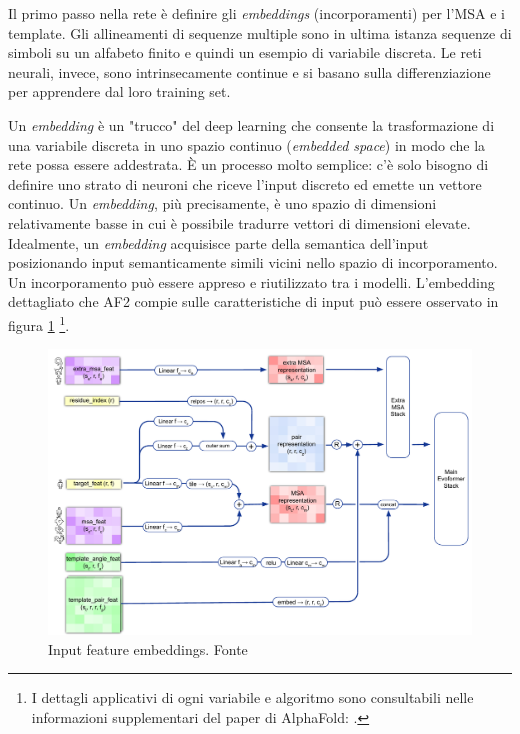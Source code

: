Il primo passo nella rete è definire gli \textit{embeddings} (incorporamenti) per l'MSA e i template. Gli allineamenti di sequenze multiple sono in ultima istanza sequenze di simboli su un alfabeto finito e quindi un esempio di variabile discreta. Le reti neurali, invece, sono intrinsecamente continue e si basano sulla differenziazione per apprendere dal loro training set. 

\par Un \textit{embedding} è un "trucco" del deep learning che consente la trasformazione di una variabile discreta in uno spazio continuo (\textit{embedded space}) in modo che la rete possa essere addestrata. È un processo molto semplice: c'è solo bisogno di definire uno strato di neuroni che riceve l'input discreto ed emette un vettore continuo. Un \textit{embedding}, più precisamente, è uno spazio di dimensioni relativamente basse in cui è possibile tradurre vettori di dimensioni elevate.  Idealmente, un \textit{embedding} acquisisce parte della semantica dell'input posizionando input semanticamente simili vicini nello spazio di incorporamento.  Un incorporamento può essere appreso e riutilizzato tra i modelli. L'embedding dettagliato che AF2 compie sulle caratteristiche di input può essere osservato in figura \ref{fig:af2-emebddings} \footnote{I dettagli applicativi di ogni variabile e algoritmo sono consultabili nelle informazioni supplementari del paper di AlphaFold: .}.

\begin{figure}[!htb]
	\centering
	\includegraphics[scale=0.46]{images/af2-input-embeddings.png}
	\caption{Input feature embeddings. Fonte\cite{supplementaryjumper2021highly}}
	\label{fig:af2-emebddings}
\end{figure}

